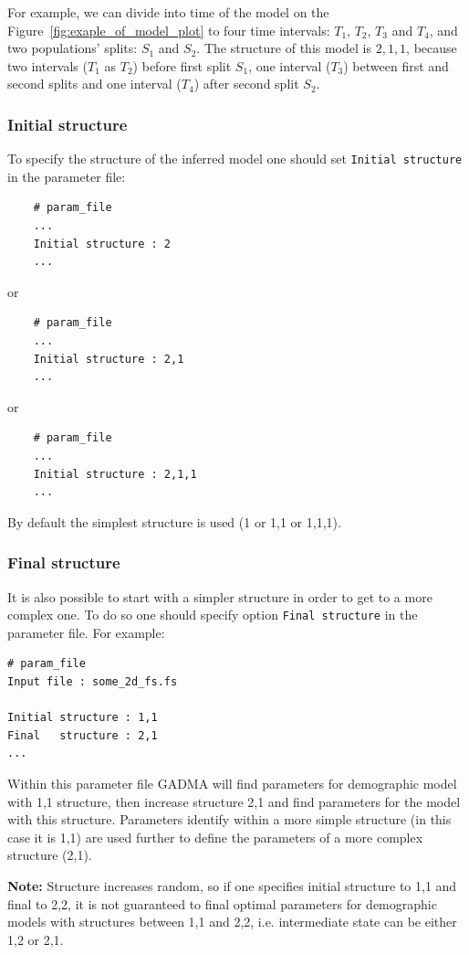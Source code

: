 \documentclass[12pt]{article}
\makeatletter
\newcommand{\py}[1]{\lstinline[language=Python, showstringspaces=False]@#1@}
\makeatother
\begin{document}
For example, we can divide into time of the model on the Figure~\ref{fig:exaple_of_model_plot} to four time intervals: $T_1$, $T_2$, $T_3$ and $T_4$, and two populations' splits: $S_1$ and $S_2$. The structure of this model is $2,1,1$, because two intervals ($T_1$ as $T_2$) before first split $S_1$, one interval ($T_3$) between first and second splits and one interval ($T_4$) after second split $S_2$.

\subsubsection{Initial structure}
To specify the structure of the inferred model one should set \py{Initial structure} in the parameter file:

\begin{lstlisting}
    # param_file
    ...
    Initial structure : 2
    ...
\end{lstlisting}
or
\begin{lstlisting}
    # param_file
    ...
    Initial structure : 2,1
    ...
\end{lstlisting}
or
\begin{lstlisting}
    # param_file
    ...
    Initial structure : 2,1,1
    ...
\end{lstlisting}
By default the simplest structure is used (1 or 1,1 or 1,1,1).

\subsubsection{Final structure}
It is also possible to start with a simpler structure in order to get to a more complex one. To do so one should specify option \py{Final structure} in the parameter file. For example:

\begin{lstlisting}
# param_file
Input file : some_2d_fs.fs
    
Initial structure : 1,1
Final   structure : 2,1
...
\end{lstlisting}
Within this parameter file GADMA will find parameters for demographic model with 1,1 structure, then increase structure  2,1 and find parameters for the model with this structure. Parameters identify within a more simple structure (in this case it is 1,1) are used further to define the parameters of a more complex structure (2,1).

\textbf{Note:} Structure increases random, so if one specifies initial structure to 1,1 and final to 2,2, it is not guaranteed to final optimal parameters for demographic models with structures between 1,1 and 2,2, i.e. intermediate state can be either 1,2 or 2,1.
\end{document}
